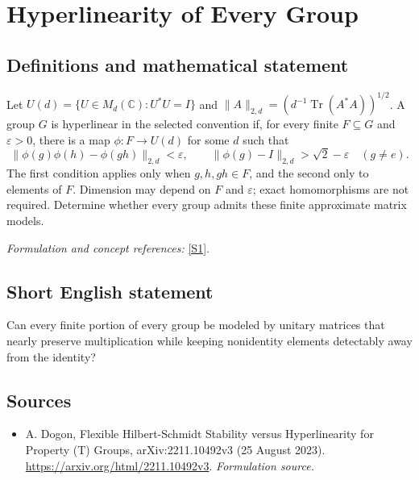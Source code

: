 \documentclass[11pt]{article}
\begin{document}
\section*{\texorpdfstring{Hyperlinearity of Every Group}{Hyperlinearity of Every Group}}\label{statement}
\subsection{Definitions and mathematical statement}
Let $U(d)=\{U\in M_d({\mathbb{C}}):U^*U=I\}$ and
$\|A\|_{2,d}=(d^{-1}\operatorname{Tr}(A^*A))^{1/2}$. A group $G$ is hyperlinear in the selected convention if, for every finite $F\subseteq G$ and ${\varepsilon}>0$, there is a map $\phi:F\to U(d)$ for some $d$ such that
\[
 \|\phi(g)\phi(h)-\phi(gh)\|_{2,d}<{\varepsilon},
 \qquad \|\phi(g)-I\|_{2,d}>\sqrt2-{\varepsilon}\quad(g\ne e).
\]
The first condition applies only when $g,h,gh\in F$, and the second only to elements of $F$. Dimension may depend on $F$ and ${\varepsilon}$; exact homomorphisms are not required. Determine whether every group admits these finite approximate matrix models.
\par\smallskip\textit{Formulation and concept references:} \href{https://arxiv.org/html/2211.10492v3}{[S1]}.

\subsection{Short English statement}
Can every finite portion of every group be modeled by unitary matrices that nearly preserve multiplication while keeping nonidentity elements detectably away from the identity?
\subsection{Sources}
\begin{itemize}
\item[S1]A. Dogon, Flexible Hilbert-Schmidt Stability versus Hyperlinearity for Property (T) Groups, arXiv:2211.10492v3 (25 August 2023).
\url{https://arxiv.org/html/2211.10492v3}.
\textit{Formulation source.}
\end{itemize}
\end{document}
